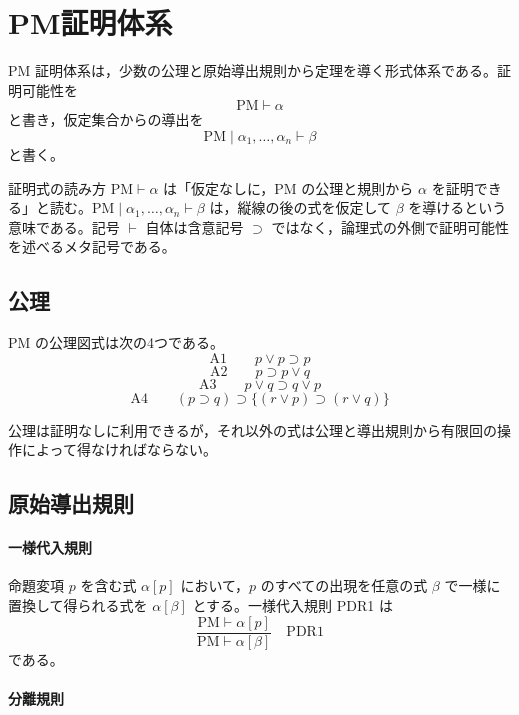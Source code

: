 \documentclass[../main.tex]{subfiles}
\begin{document}
\section{PM証明体系}

PM 証明体系は，少数の公理と原始導出規則から定理を導く形式体系である。証明可能性を
\[
  \mathrm{PM}\vdash\alpha
\]
と書き，仮定集合からの導出を
\[
  \mathrm{PM}\mid\alpha_1,\ldots,\alpha_n\vdash\beta
\]
と書く。

\begin{sidebox}[TBred]{証明式の読み方}
  \(\mathrm{PM}\vdash\alpha\) は「仮定なしに，PM の公理と規則から \(\alpha\) を証明できる」と読む。\(\mathrm{PM}\mid\alpha_1,\ldots,\alpha_n\vdash\beta\) は，縦線の後の式を仮定して \(\beta\) を導けるという意味である。記号 \(\vdash\) 自体は含意記号 \(\supset\) ではなく，論理式の外側で証明可能性を述べるメタ記号である。
\end{sidebox}

\subsection{公理}

PM の公理図式は次の4つである。
\[
  \mathrm{A1}
  \qquad
  p\lor p \supset p
\]
\[
  \mathrm{A2}
  \qquad
  p \supset p\lor q
\]
\[
  \mathrm{A3}
  \qquad
  p\lor q \supset q\lor p
\]
\[
  \mathrm{A4}
  \qquad
  (p\supset q)
  \supset
  \{(r\lor p)\supset(r\lor q)\}
\]

公理は証明なしに利用できるが，それ以外の式は公理と導出規則から有限回の操作によって得なければならない。

\subsection{原始導出規則}

\paragraph{一様代入規則}

命題変項 \(p\) を含む式 \(\alpha[p]\) において，\(p\) のすべての出現を任意の式 \(\beta\) で一様に置換して得られる式を \(\alpha[\beta]\) とする。一様代入規則 PDR1 は
\[
  \frac{\mathrm{PM}\vdash\alpha[p]}
       {\mathrm{PM}\vdash\alpha[\beta]}
  \quad\mathrm{PDR1}
\]
である。

\paragraph{分離規則}
\end{document}
